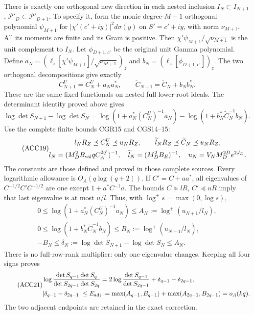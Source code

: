 \documentclass[11pt]{article}
\begin{document}
There is exactly one orthogonal new direction in each nested
inclusion \(I_N\subset I_{N+1}\), \(\mathcal P'_D\subset\mathcal P'_{D+1}\).
To specify it, form the monic degree-\(M+1\) orthogonal polynomial
\(\psi_{M+1}\) for
\(|\chi'(c'+iy)|^2d\sigma(y)\) on \(S'=c'+iy\), with norm
\(\nu_{M+1}\). All its moments are finite and its Gram is positive.
Then \(\chi'\psi_{M+1}/\sqrt{\nu_{M+1}}\) is the unit complement to
\(I_N\). Let \(\phi_{D+1,c'}\) be the original unit Gamma polynomial.
Define
\(a_N=(\ell_z[\chi'\psi_{M+1}]/\sqrt{\nu_{M+1}})_z\) and
\(b_N=(\ell_z[\phi_{D+1,c'}])_z\).
The two orthogonal decompositions give exactly
\begin{equation}\tag{ACC17}
C_{N+1}^U=C_N^U+a_Na_N^*,\qquad
\widetilde C_{N+1}=\widetilde C_N+b_Nb_N^* .
\end{equation}
These are the same fixed functionals on nested full lower-root ideals.
The determinant identity proved above gives
\begin{equation}\tag{ACC18}
\log\det S_{N+1}-\log\det S_N
=\log(1+a_N^*(C_N^U)^{-1}a_N)
-\log(1+b_N^*\widetilde C_N^{-1}b_N).
\end{equation}
Use the complete finite bounds CGR15 and CGS14--15:
\begin{equation}\tag{ACC19}
\begin{gathered}
l_NR_Z\preceq C_N^U\preceq u_NR_Z,\qquad
\widetilde l_NR_Z\preceq\widetilde C_N\preceq u_NR_Z,\\
l_N=(M_D^2B_{\rm val}qC_A^{2q'})^{-1},\quad
\widetilde l_N=(M_D^2B_E)^{-1},\quad
u_N=V_NM_D^{2D}e^{2J_D}.
\end{gathered}
\end{equation}
The constants are those defined and proved in those complete sources.
Every logarithmic allowance is \(O_A(q\log(q+2))\).
If \(C'=C+aa^*\), all eigenvalues of \(C^{-1/2}C'C^{-1/2}\)
are one except \(1+a^*C^{-1}a\). The bounds \(C\succeq lR\),
\(C'\preceq uR\) imply that last eigenvalue is at most \(u/l\).
Thus, with \(\log^+s=\max(0,\log s)\),
\begin{equation}\tag{ACC20}
\begin{gathered}
0\le\log(1+a_N^*(C_N^U)^{-1}a_N)\le A_N:=\log^+(u_{N+1}/l_N),\\
0\le\log(1+b_N^*\widetilde C_N^{-1}b_N)
\le B_N:=\log^+(u_{N+1}/\widetilde l_N),\\
-B_N\le\delta_N:=\log\det S_{N+1}-\log\det S_N\le A_N .
\end{gathered}
\end{equation}
There is no full-row-rank multiplier: only one eigenvalue changes.
Keeping all four signs proves
\begin{equation}\tag{ACC21}
\begin{aligned}
&\log\frac{\det S_{q-1}\det S_q}{\det S_{2q-1}\det S_{2q}}
=2\log\frac{\det S_{q-1}}{\det S_{2q-1}}
+\delta_{q-1}-\delta_{2q-1},\\
&|\delta_{q-1}-\delta_{2q-1}|
\le E_{\rm adj}:=\max(A_{q-1},B_{q-1})
+\max(A_{2q-1},B_{2q-1})=o_A(kq).
\end{aligned}
\end{equation}
The two adjacent endpoints are retained in the exact correction.
\end{document}
